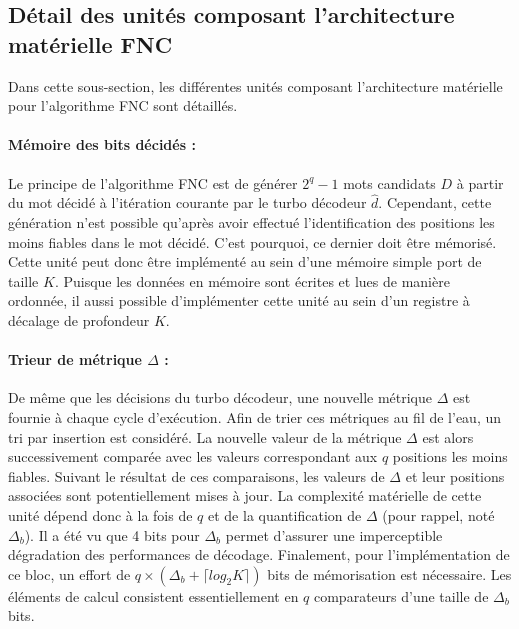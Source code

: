 \subsection{Détail des unités composant l'architecture matérielle FNC}
Dans cette sous-section, les différentes unités composant l'architecture matérielle pour l'algorithme FNC sont détaillés.

\paragraph*{Mémoire des bits décidés :} Le principe de l'algorithme FNC est de générer $2^q-1$ mots candidats $D$ à partir 
du mot décidé à l'itération courante par le turbo décodeur $\hat{d}$. Cependant, cette génération n'est possible 
qu'après avoir effectué  l'identification des positions les moins fiables dans le mot décidé. C'est pourquoi, ce dernier doit 
être mémorisé. Cette unité peut donc être implémenté au sein d'une mémoire simple port de taille $K$. Puisque les données en 
mémoire sont écrites et lues de manière ordonnée, il aussi possible d'implémenter cette unité au sein d'un registre à décalage 
de profondeur $K$.

\paragraph*{Trieur de métrique $\Delta$ :} De même que les décisions du turbo décodeur, une nouvelle métrique $\Delta$ 
est fournie à chaque cycle d'exécution. Afin de trier ces métriques au
fil de l'eau, un tri par insertion est considéré. La nouvelle valeur de la métrique $\Delta$ est alors successivement 
comparée avec les valeurs correspondant aux $q$ positions les moins fiables. Suivant le résultat de ces comparaisons, 
les valeurs de $\Delta$ et leur positions associées sont potentiellement mises à jour. La complexité matérielle de cette unité dépend donc 
à la fois de $q$ et de la quantification de $\Delta$ (pour rappel, noté $\Delta_b$). Il a été vu que 4 bits 
pour $\Delta_b$ permet d'assurer une imperceptible dégradation des performances de décodage. Finalement, pour 
l'implémentation de ce bloc, un effort de 
$q\times(\Delta_b + \lceil log_2{K} \rceil)$ bits de mémorisation est nécessaire. Les éléments de calcul consistent 
essentiellement en $q$ comparateurs d'une taille de $\Delta_b$ bits.

